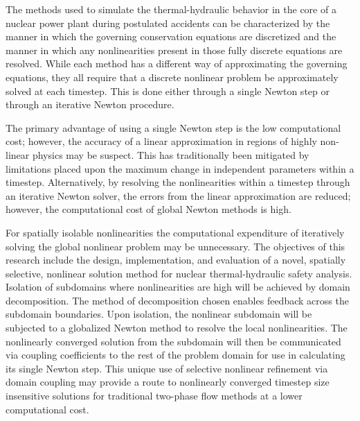 The methods used to simulate the thermal-hydraulic behavior in the core of a nuclear power plant during postulated accidents can be characterized by the manner in which the governing conservation equations are discretized and the manner in which any nonlinearities present in those fully discrete equations are resolved.
While each method has a different way of approximating the governing equations, they all require that a discrete nonlinear problem be approximately solved at each timestep.
This is done either through a single Newton step or through an iterative Newton procedure.

The primary advantage of using a single Newton step is the low computational cost; however, the accuracy of a linear approximation in regions of highly non-linear physics may be suspect.
This has traditionally been mitigated by limitations placed upon the maximum change in independent parameters within a timestep.
Alternatively, by resolving the nonlinearities within a timestep through an iterative Newton solver, the errors from the linear approximation are reduced; however, the computational cost of global Newton methods is high.

For spatially isolable nonlinearities the computational expenditure of iteratively solving the global nonlinear problem may be unnecessary.
The objectives of this research include the design, implementation, and evaluation of a novel, spatially selective, nonlinear solution method for nuclear thermal-hydraulic safety analysis.
Isolation of subdomains where nonlinearities are high will be achieved by domain decomposition.
The method of decomposition chosen enables feedback across the subdomain boundaries. 
Upon isolation, the nonlinear subdomain will be subjected to a globalized Newton method to resolve the local nonlinearities.
The nonlinearly converged solution from the subdomain will then be communicated via coupling coefficients to the rest of the problem domain for use in calculating its single Newton step.
This unique use of selective nonlinear refinement via domain coupling may provide a route to nonlinearly converged timestep size insensitive solutions for traditional two-phase flow methods at a lower computational cost.